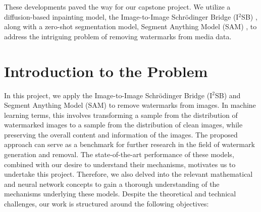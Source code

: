 




These developments paved the way for our capstone project. We utilize a diffusion-based inpainting model, the Image-to-Image Schrödinger Bridge (I$^2$SB) \cite{liu2023i2sb}, along with a zero-shot segmentation model, Segment Anything Model (SAM) \cite{kirillov2023segment}, to address the intriguing problem of removing watermarks from media data.


\section{Introduction to the Problem}
In this project, we apply the Image-to-Image Schrödinger Bridge (I$^2$SB) and Segment Anything Model (SAM) to remove watermarks from images. In machine learning terms, this involves transforming a sample from the distribution of watermarked images to a sample from the distribution of clean images, while preserving the overall content and information of the images. The proposed approach can serve as a benchmark for further research in the field of watermark generation and removal. The state-of-the-art performance of these models, combined with our desire to understand their mechanisms, motivates us to undertake this project. Therefore, we also delved into the relevant mathematical and neural network concepts to gain a thorough understanding of the mechanisms underlying these models. Despite the theoretical and technical challenges, our work is structured around the following objectives:


